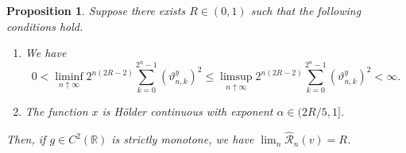 \documentclass[10pt,a4paper]{amsart}
\newtheorem{proposition}{Proposition}
\newcommand{\bR}{\mathbb{R}}
\def\cR{{\mathscr R}}
\def\ua{\uparrow}
\def\wh{\widehat}
\begin{document}
\begin{proposition}\label{Prop tilde H z} Suppose there exists ${R}\in(0,1)$ such that the following conditions hold.
\begin{enumerate}
\item \label{Prop tilde H z part a}We have  
	\begin{equation}\label{Prop tilde H z a assumption eq}
	0< \liminf_{n \ua \infty}2^{n(2{R}-2)}\sum_{k = 0}^{2^n-1}\left(\vartheta^y_{n,k}\right)^2\le \limsup_{n \ua \infty}2^{n(2{R}-2)}\sum_{k = 0}^{2^{n}-1}\left(\vartheta^y_{n,k}\right)^2<\infty.
	\end{equation}
	
\item\label{Prop tilde H z part b}  The function $x$ is H\"older continuous with exponent $\alpha\in(2{R}/5,1]$. 
\end{enumerate}
Then, if $g\in C^2(\bR)$ is strictly monotone,  we have $\lim_n\wh\cR_n(v)={R}$.
\end{proposition}
\end{document}
